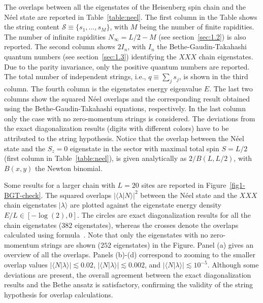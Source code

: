 \documentclass[11pt]{iopart}
\begin{document}
The overlaps between all the eigenstates of the Heisenberg spin chain and the N\'eel 
state are reported in Table~\ref{table:neel}. The first column in the Table shows 
the string content ${\mathcal S}\equiv\{s_1,\dots,s_M\}$, with $M$ being the number 
of finite rapidities. The number of infinite rapidities $N_{\infty}=L/2-M$ (see 
section~\ref{sec:1.2}) is also reported. The second column shows $2I_n$, with $I_n$ 
the Bethe-Gaudin-Takahashi quantum numbers (see section~\ref{sec:1.3}) identifying 
the $XXX$ chain eigenstates. Due to the parity invariance, only the positive quantum 
numbers are reported. The total number of independent strings, i.e., $q\equiv\sum_js_j$, 
is shown in the third column. The fourth column is the eigenstates energy eigenvalue 
$E$. The last two columns show the squared N\'eel overlaps and the corresponding result 
obtained using the Bethe-Gaudin-Takahashi equations, respectively. In the last 
column only the case with no zero-momentum strings is considered. The deviations 
from the exact diagonalization results (digits with different colors) have to be 
attributed to the string hypothesis. Notice that the overlap between the N\'eel 
state and the $S_z=0$ eigenstate in the sector with maximal total spin $S=L/2$ 
(first column in Table~\ref{table:neel}), is given analytically as $2/B(L,L/2)$, 
with $B(x,y)$ the Newton binomial. 

Some results for a larger chain with $L=20$ sites are reported in 
Figure~\ref{fig1-BGT-check}.  The squared overlaps $|\langle\lambda|
N\rangle|^2$ between the N\'eel state and the $XXX$ chain eigenstates $|\lambda
\rangle$ are plotted against the eigenstate energy density $E/L
\in[-\log(2),0]$. The circles are exact diagonalization results for all 
the chain eigenstates ($382$ eigenstates), whereas the crosses denote the 
overlaps calculated using formula~. Note that only the 
eigenstates with no zero-momentum strings are shown ($252$ eigenstates) 
in the Figure. Panel (a) gives an overview of all the overlaps. Panels (b)-(d) 
correspond to zooming to the smaller overlap values $|\langle N|\lambda
\rangle|\lesssim 0.02$, $|\langle N|\lambda\rangle|\lesssim 0.002$, and 
$|\langle N|\lambda\rangle|\lesssim 10^{-5}$. 
Although some deviations are present, the overall agreement between the exact 
diagonalization results and the Bethe ansatz is satisfactory, confirming 
the validity of the string hypothesis for overlap calculations. 
\end{document}
